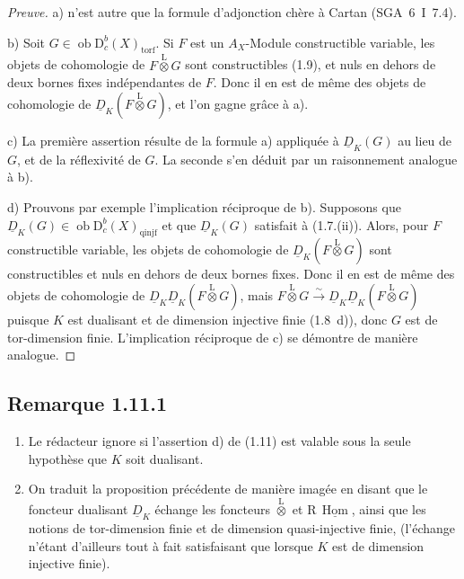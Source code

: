 \documentclass[11pt]{article}
\DeclareMathOperator{\Hom}{Hom}
\newcommand{\R}{\mathrm{R}}
\newcommand{\D}{\mathrm{D}}
\newcommand{\ob}{\operatorname{ob}}
\providecommand{\Hom}{\operatorname{Hom}}
\providecommand{\ob}{\operatorname{ob}}
\providecommand{\R}{\mathrm R}
\providecommand{\Hom}{\operatorname{Hom}}
\begin{document}
\begin{proof}[Preuve]
a) n'est autre que la formule d'adjonction chère à Cartan (SGA~6~I~7.4).

b) Soit $G \in \ob \D_c^{b}(X)_{\mathrm{torf}}$. Si $F$ est un $A_X$-Module constructible variable, les objets de cohomologie de $F \mathop{\otimes}\limits^{\mathrm{L}} G$ sont constructibles (1.9), et nuls en dehors de deux bornes fixes indépendantes de $F$. Donc il en est de même des objets de cohomologie de $\underline{D}_K(F \mathop{\otimes}\limits^{\mathrm{L}} G)$, et l'on gagne grâce à a).

c) La première assertion résulte de la formule a) appliquée à $\underline{D}_K(G)$ au lieu de $G$, et de la réflexivité de $G$. La seconde s'en déduit par un raisonnement analogue à b).

d) Prouvons par exemple l'implication réciproque de b). Supposons que $\underline{D}_K(G) \in \ob \D_c^{b}(X)_{\mathrm{qinjf}}$ et que $\underline{D}_K(G)$ satisfait à (1.7.(ii)). Alors, pour $F$ constructible variable, les objets de cohomologie de $\underline{D}_K(F \mathop{\otimes}\limits^{\mathrm{L}} G)$ sont constructibles et nuls en dehors de deux bornes fixes. Donc il en est de même des objets de cohomologie de $\underline{D}_K \underline{D}_K(F \mathop{\otimes}\limits^{\mathrm{L}} G)$, mais $F \mathop{\otimes}\limits^{\mathrm{L}} G \xrightarrow{\sim} \underline{D}_K \underline{D}_K(F \mathop{\otimes}\limits^{\mathrm{L}} G)$ puisque $K$ est dualisant et de dimension injective finie (1.8~d)), donc $G$ est de tor-dimension finie. L'implication réciproque de c) se démontre de manière analogue.
\end{proof}

\subsection*{Remarque 1.11.1}
\begin{enumerate}
\item[a)] Le rédacteur ignore si l'assertion d) de (1.11) est valable sous la seule hypothèse que $K$ soit dualisant.
\item[b)] On traduit la proposition précédente de manière imagée en disant que le foncteur dualisant $\underline{D}_K$ échange les foncteurs $\mathop{\otimes}\limits^{\mathrm{L}}$ et $\R\,\underline{\Hom}$, ainsi que les notions de tor-dimension finie et de dimension quasi-injective finie, (l'échange n'étant d'ailleurs tout à fait satisfaisant que lorsque $K$ est de dimension injective finie).
\end{enumerate}
\end{document}
